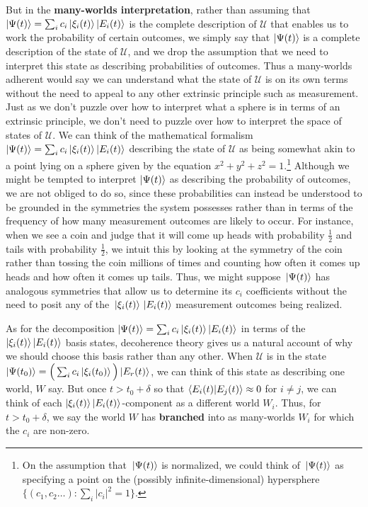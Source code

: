     But in the \textbf{many-worlds interpretation}, rather than assuming that $\ket{\Psi(t)}=\sum_i c_i \ket{\xi_i(t)}\ket{E_i(t)}$ is the complete description of $\mathcal{U}$ that enables us to work the probability of certain outcomes, we simply say that $\ket{\Psi(t)}$ is a complete description of the state of $\mathcal{U}$, and we drop the assumption that we need to interpret this state as describing probabilities of outcomes. Thus a many-worlds adherent would say we can understand what the state of $\mathcal{U}$ is on its own terms without the need to appeal to any other extrinsic principle such as measurement. Just as we don't puzzle over how to interpret what a sphere is in terms of an extrinsic principle, we don't need to puzzle over how to interpret the space of states of $\mathcal{U}$. We can think of the mathematical formalism $\ket{\Psi(t)}=\sum_i c_i \ket{\xi_i(t)}\ket{E_i(t)}$ describing the state of $\mathcal{U}$ as being somewhat akin to a point lying on a sphere given by the equation $x^2+y^2+z^2=1$.\footnote{On the assumption that $\ket*{\Psi(t)}$ is normalized, we could think of $\ket*{\Psi(t)}$ as specifying a point on the (possibly infinite-dimensional) hypersphere $\{(c_1,c_2\ldots):\sum_i|c_i|^2=1\}.$} Although we might be tempted to interpret $\ket{\Psi(t)}$ as describing the probability of outcomes, we are not obliged to do so,  since these probabilities can instead be understood to be grounded in the symmetries the system possesses rather than in terms of the frequency of how many measurement outcomes are likely to occur. For instance, when we see a coin and judge that it will come up heads with probability $\frac{1}{2}$ and tails with probability $\frac{1}{2}$, we intuit this by looking at the symmetry of the coin rather than tossing the coin millions of times and counting how often it comes up heads and how often it comes up tails. Thus, we might suppose $\ket*{\Psi(t)}$ has analogous symmetries that allow us to determine its $c_i$ coefficients without the need to posit any of the $\ket*{\xi_i(t)}\ket*{E_i(t)}$ measurement outcomes being realized.
     
    As for the decomposition $\ket{\Psi(t)}=\sum_i c_i \ket{\xi_i(t)}\ket{E_i(t)}$  in terms of the $\ket{\xi_i(t)}\ket{E_i(t)}$ basis states, decoherence theory gives us a natural account of why we should choose this basis rather than any other. When $\mathcal{U}$ is in the state $\ket{\Psi(t_0)}=\Big(\sum_i c_i \ket{\xi_i(t_0)}\Big)\ket{E_r(t)}$, we can think of this state as describing one world, $W$ say. But once $t>t_0+\delta$ so that $\ip{E_i(t)}{E_j(t)}\approx 0$ for $i\neq j$, we can think of each $\ket{\xi_i(t)}\ket{E_i(t)}$-component as a different world $W_i$. Thus, for $t>t_0+\delta$, we say the world $W$ has \textbf{branched} into as many-worlds $W_i$ for which the $c_i$ are non-zero. 
    
